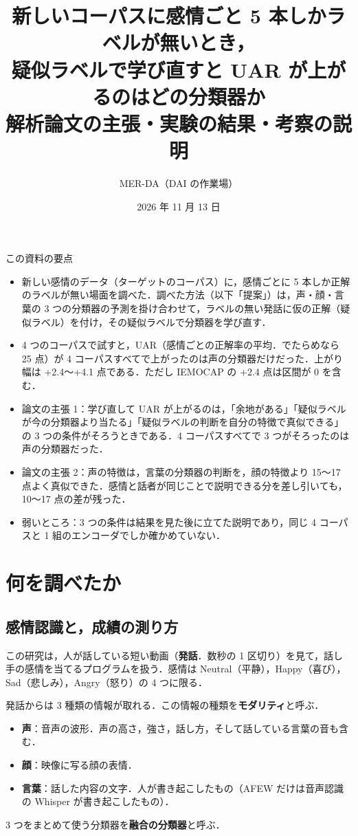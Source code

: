 \documentclass[a4paper,11pt]{ltjsarticle}
\title{新しいコーパスに感情ごと 5 本しかラベルが無いとき，\\疑似ラベルで学び直すと UAR が上がるのはどの分類器か\\[4pt]
\large 解析論文の主張・実験の結果・考察の説明}
\author{MER-DA（DAI の作業場）}
\date{2026 年 11 月 13 日}
\begin{document}
\maketitle

\begin{yoten}{この資料の要点}
\begin{itemize}
  \item 新しい感情のデータ（ターゲットのコーパス）に，感情ごとに 5 本しか正解のラベルが無い場面を調べた．調べた方法（以下「提案」）は，声・顔・言葉の 3 つの分類器の予測を掛け合わせて，ラベルの無い発話に仮の正解（疑似ラベル）を付け，その疑似ラベルで分類器を学び直す．
  \item 4 つのコーパスで試すと，UAR（感情ごとの正解率の平均．でたらめなら 25 点）が 4 コーパスすべてで上がったのは声の分類器だけだった．上がり幅は +2.4〜+4.1 点である．ただし IEMOCAP の +2.4 点は区間が 0 を含む．
  \item 論文の主張 1：学び直して UAR が上がるのは，「余地がある」「疑似ラベルが今の分類器より当たる」「疑似ラベルの判断を自分の特徴で真似できる」の 3 つの条件がそろうときである．4 コーパスすべてで 3 つがそろったのは声の分類器だった．
  \item 論文の主張 2：声の特徴は，言葉の分類器の判断を，顔の特徴より 15〜17 点よく真似できた．感情と話者が同じことで説明できる分を差し引いても，10〜17 点の差が残った．
  \item 弱いところ：3 つの条件は結果を見た後に立てた説明であり，同じ 4 コーパスと 1 組のエンコーダでしか確かめていない．
\end{itemize}
\end{yoten}

\tableofcontents
\newpage

\section{何を調べたか}

\subsection{感情認識と，成績の測り方}

この研究は，人が話している短い動画（\textbf{発話}．数秒の 1 区切り）を見て，話し手の感情を当てるプログラムを扱う．感情は Neutral（平静），Happy（喜び），Sad（悲しみ），Angry（怒り）の 4 つに限る．

発話からは 3 種類の情報が取れる．この情報の種類を\textbf{モダリティ}と呼ぶ．
\begin{itemize}
  \item \textcolor{cA}{\textbf{声}}：音声の波形．声の高さ，強さ，話し方，そして話している言葉の音も含む．
  \item \textcolor{cV}{\textbf{顔}}：映像に写る顔の表情．
  \item \textcolor{cT}{\textbf{言葉}}：話した内容の文字．人が書き起こしたもの（AFEW だけは音声認識の Whisper が書き起こしたもの）．
\end{itemize}
3 つをまとめて使う分類器を\textbf{融合の分類器}と呼ぶ．
\end{document}
